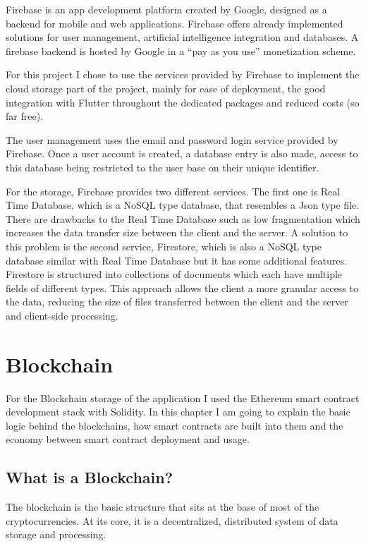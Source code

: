 \documentclass[a4paper,12pt]{report}
\begin{document}
Firebase\cite{firebaseDocs} is an app development platform created by Google,
designed as a backend for mobile and web applications. Firebase offers already
implemented solutions for user management, artificial intelligence integration
and databases. A firebase backend is hosted by Google in a ``pay as you use''
monetization scheme.

For this project I chose to use the services provided by Firebase to implement
the cloud storage part of the project, mainly for ease of deployment, the good
integration with Flutter throughout the dedicated packages and reduced costs
(so far free).

The user management uses the email and password login service provided by
Firebase. Once a user account is created, a database entry is also made, access
to this database being restricted to the user base on their unique identifier.

For the storage, Firebase provides two different services. The first one is
Real Time Database, which is a NoSQL type database, that resembles a Json type
file. There are drawbacks to the Real Time Database such as low fragmentation
which increases the data transfer size between the client and the server. A
solution to this problem is the second service, Firestore, which is also a
NoSQL type database similar with Real Time Database but it has some additional
features. Firestore is structured into collections of documents which each have
multiple fields of different types. This approach allows the client a more
granular access to the data, reducing the size of files transferred between the
client and the server and client-side processing.

\section{Blockchain}

For the Blockchain storage of the application I used the Ethereum smart
contract development stack with Solidity. In this chapter I am going to explain
the basic logic behind the blockchains, how smart contracts are built into them
and the economy between smart contract deployment and usage.

\subsection{What is a Blockchain?}

The blockchain is the basic structure that sits at the base of most of the
cryptocurrencies. At its core, it is a decentralized, distributed system of
data storage and processing.
\end{document}
